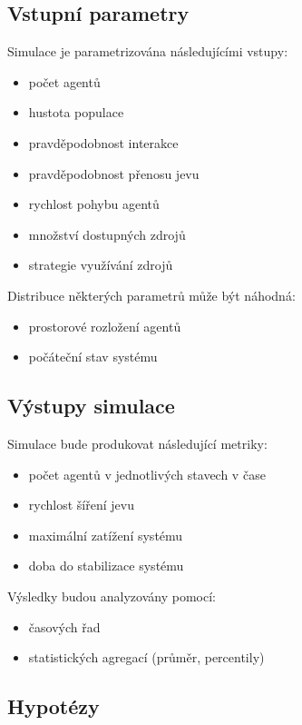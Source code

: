 \subsection{Vstupní parametry}

Simulace je parametrizována následujícími vstupy:

\begin{itemize}
\item počet agentů
\item hustota populace
\item pravděpodobnost interakce
\item pravděpodobnost přenosu jevu
\item rychlost pohybu agentů
\item množství dostupných zdrojů
\item strategie využívání zdrojů
\end{itemize}

Distribuce některých parametrů může být náhodná:
\begin{itemize}
\item prostorové rozložení agentů
\item počáteční stav systému
\end{itemize}

\subsection{Výstupy simulace}

Simulace bude produkovat následující metriky:

\begin{itemize}
\item počet agentů v jednotlivých stavech v čase
\item rychlost šíření jevu
\item maximální zatížení systému
\item doba do stabilizace systému
\end{itemize}

Výsledky budou analyzovány pomocí:
\begin{itemize}
\item časových řad
\item statistických agregací (průměr, percentily)
\end{itemize}

\subsection{Hypotézy}

